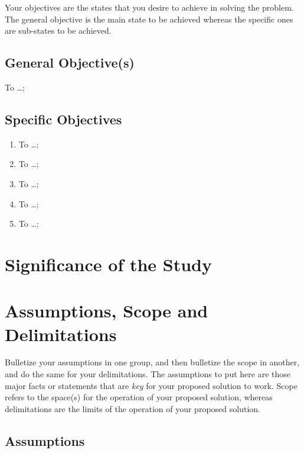 Your objectives are the states that you desire to achieve in solving the problem. The general objective is the main state to be achieved whereas the specific ones are sub-states to be achieved.

\subsection{General Objective(s)}
To \ldots;

\subsection{Specific Objectives}

\begin{enumerate}
	\item To  \ldots;
	
	\item To  \ldots;
	
	\item To  \ldots;
	
	\item To  \ldots;
	
	\item To  \ldots;
\end{enumerate}



\section{Significance of the Study}

\graytx{\blindtext}



\section{Assumptions, Scope and Delimitations}

Bulletize your assumptions in one group, and then bulletize the scope in another, and do the same for your delimitations. The assumptions to put here are those major facts or statements that are \textit{key} for your proposed solution to work. Scope refers to the space(s) for the operation of your proposed solution, whereas delimitations are the limits of the operation of your proposed solution.

\subsection{Assumptions}

